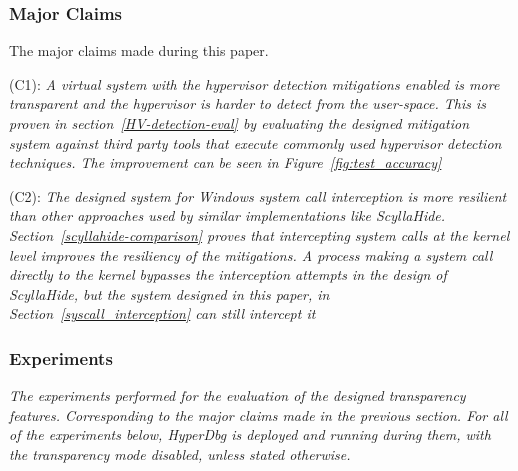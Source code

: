 \subsubsection{Major Claims}
The major claims made during this paper.\\

\begin{compactdesc}

    \item[(C1):] \textit{A virtual system with the hypervisor detection mitigations enabled is more transparent and the hypervisor is harder to detect from the user-space. 
    This is proven in section~\ref{HV-detection-eval} by evaluating the designed mitigation system against third party tools that execute commonly used hypervisor detection techniques. 
    The improvement can be seen in Figure~\ref{fig:test_accuracy}}

    \item[(C2):] \textit{The designed system for Windows system call interception is more resilient than other approaches used by similar implementations like ScyllaHide. Section~\ref{scyllahide-comparison}
    proves that intercepting system calls at the kernel level improves the resiliency of the mitigations. 
    A process making a system call directly to the kernel bypasses the interception attempts in the design of ScyllaHide, but the system designed in this paper, in Section~\ref{syscall_interception} can still intercept it}

\end{compactdesc}

\subsubsection{Experiments}
\textit{The experiments performed for the evaluation of the designed transparency features. Corresponding to the major claims made in the previous section.
For all of the experiments below, HyperDbg is deployed and running during them, with the transparency mode disabled, unless stated otherwise.}

